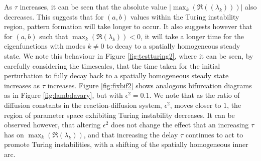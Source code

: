 As $\tau$ increases, it can be seen that the absolute value $|\max_k(\Re((\lambda_k)))|$ also decreases. This suggests that for $(a,b)$ values within the Turing instability region, pattern formation will take longer to occur. It also suggests however that for $(a,b)$ such that $\max_k(\Re(\lambda_k))<0$, it will take a longer time for the eigenfunctions with modes $k\neq0$ to decay to a spatially homogeneous steady state. We note this behaviour in Figure \ref{fig:testturing2}, where it can be seen, by carefully considering the timescales, that the time taken for the initial perturbation to fully decay back to a spatially homogeneous steady state increases as $\tau$ increases. Figure \ref{fig:fixbif2} shows analogous bifurcation diagrams as in Figure \ref{fig:lambdavary}, but with $\epsilon^2=0.1$. We note that as the ratio of diffusion constants in the reaction-diffusion system, $\epsilon^2$, moves closer to $1$, the region of parameter space exhibiting Turing instability decreases. It can be observed however, that altering $\epsilon^2$ does not change the effect that an increasing $\tau$ has on $\max_k(\Re(\lambda_k))$, and that increasing the delay $\tau$ continues to act to promote Turing instabilities, with a shifting of the spatially homogeneous inner arc.

